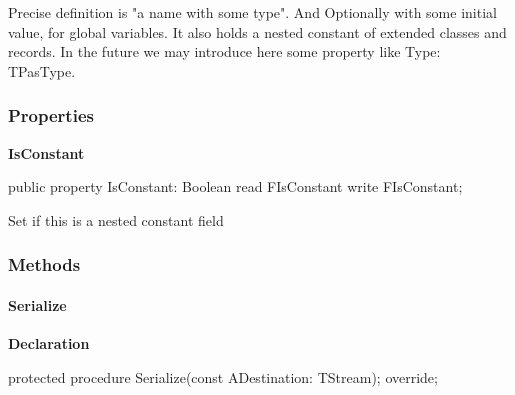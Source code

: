\documentclass{report}
\newif\ifpdf
\begin{document}
Precise definition is "a name with some type". And Optionally with some initial value, for global variables. It also holds a nested constant of extended classes and records. In the future we may introduce here some property like Type: TPasType.\subsubsection*{\large{\textbf{Properties}}\normalsize\hspace{1ex}\hfill}
\begin{list}{}{
\setlength{\itemindent}{0cm}
\setlength{\listparindent}{0cm}
\setlength{\leftmargin}{\evensidemargin}
\addtolength{\leftmargin}{\tmplength}
\settowidth{\labelsep}{X}
\addtolength{\leftmargin}{\labelsep}
\setlength{\labelwidth}{\tmplength}
}
\label{PasDoc_Items.TPasFieldVariable-IsConstant}
\item[\textbf{IsConstant}\hfill]
\ifpdf
\begin{flushleft}
\fi
\begin{ttfamily}
public property IsConstant: Boolean read FIsConstant write FIsConstant;\end{ttfamily}

\ifpdf
\end{flushleft}
\fi


\par Set if this is a nested constant field\end{list}
\subsubsection*{\large{\textbf{Methods}}\normalsize\hspace{1ex}\hfill}
\paragraph*{Serialize}\hspace*{\fill}

\label{PasDoc_Items.TPasFieldVariable-Serialize}
\begin{list}{}{
\setlength{\itemindent}{0cm}
\setlength{\listparindent}{0cm}
\setlength{\leftmargin}{\evensidemargin}
\addtolength{\leftmargin}{\tmplength}
\settowidth{\labelsep}{X}
\addtolength{\leftmargin}{\labelsep}
\setlength{\labelwidth}{\tmplength}
}
\item[\textbf{Declaration}\hfill]
\ifpdf
\begin{flushleft}
\fi
\begin{ttfamily}
protected procedure Serialize(const ADestination: TStream); override;\end{ttfamily}

\ifpdf
\end{flushleft}
\fi

\end{list}
\end{document}
